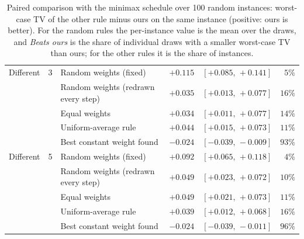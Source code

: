\begin{table}[t]
\begin{tabular}{lcl r@{\;}l r}
\addlinespace
Different & 3 & Random weights (fixed) & $+0.115$ & $[+0.085,\,+0.141]$ & $5\%$ \\
 &  & Random weights (redrawn every step) & $+0.035$ & $[+0.013,\,+0.077]$ & $16\%$ \\
 &  & Equal weights & $+0.034$ & $[+0.011,\,+0.077]$ & $14\%$ \\
 &  & Uniform-average rule & $+0.044$ & $[+0.015,\,+0.073]$ & $11\%$ \\
 &  & Best constant weight found & $-0.024$ & $[-0.039,\,-0.009]$ & $93\%$ \\
\addlinespace
Different & 5 & Random weights (fixed) & $+0.092$ & $[+0.065,\,+0.118]$ & $4\%$ \\
 &  & Random weights (redrawn every step) & $+0.049$ & $[+0.023,\,+0.072]$ & $10\%$ \\
 &  & Equal weights & $+0.049$ & $[+0.021,\,+0.073]$ & $11\%$ \\
 &  & Uniform-average rule & $+0.039$ & $[+0.012,\,+0.068]$ & $16\%$ \\
 &  & Best constant weight found & $-0.024$ & $[-0.039,\,-0.011]$ & $96\%$ \\
\bottomrule
\end{tabular}
\caption{Paired comparison with the minimax schedule over 100 random instances: worst-case TV of the other rule minus ours on the same instance (positive: ours is better). For the random rules the per-instance value is the mean over the draws, and \emph{Beats ours} is the share of individual draws with a smaller worst-case TV than ours; for the other rules it is the share of instances.}
\label{tab:random-paired}
\end{table}

